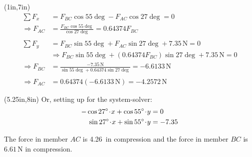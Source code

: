\documentclass[10pt,oneside]{article}
\begin{document}
\begin{textblock*}{3.5in}(1in,7in)
	\centering
	\begin{align*}
		\sum F_x &= F_{BC}\cos 55\deg - F_{AC}\cos 27\deg = 0 \\[0.25em]	
		\Rightarrow F_{AC} &= \frac{F_{BC}\cos 55\deg}{\cos 27\deg} = 0.64374F_{BC} \\\\
		\sum F_y &= F_{BC}\sin 55\deg + F_{AC}\sin 27\deg+ 7.35\,\text{N} = 0 \\[0.25em]
		&\Rightarrow  F_{BC}\sin 55\deg + (0.64374F_{BC})\sin 27\deg + 7.35\,\text{N} = 0 \\[0.25em]
		\Rightarrow F_{BC} &= \frac{-7.35\,\text{N}}{\sin 55\deg + 0.64374\sin 27\deg} = -6.6133\,\text{N} \\\\
		\Rightarrow  F_{AC} &= 0.64374(-6.6133\,\text{N}) = -4.2572\,\text{N}
	\end{align*}
\end{textblock*}

\begin{textblock*}{3in}(5.25in,8in)
	Or, setting up for the system-solver:
	\begin{align*}
		-\cos 27\deg\cd x + \cos 55\deg\cd y &= 0 \\
		\sin 27\deg\cd x + \sin 55\deg\cd y &= -7.35
	\end{align*} 
	\parb
	\raggedright
	The force in member $AC$ is 4.26\, in compression and the force in member $BC$ is $6.61\,\text{N}$ in compression.
	
\end{textblock*}

~\newpage
\end{document}
